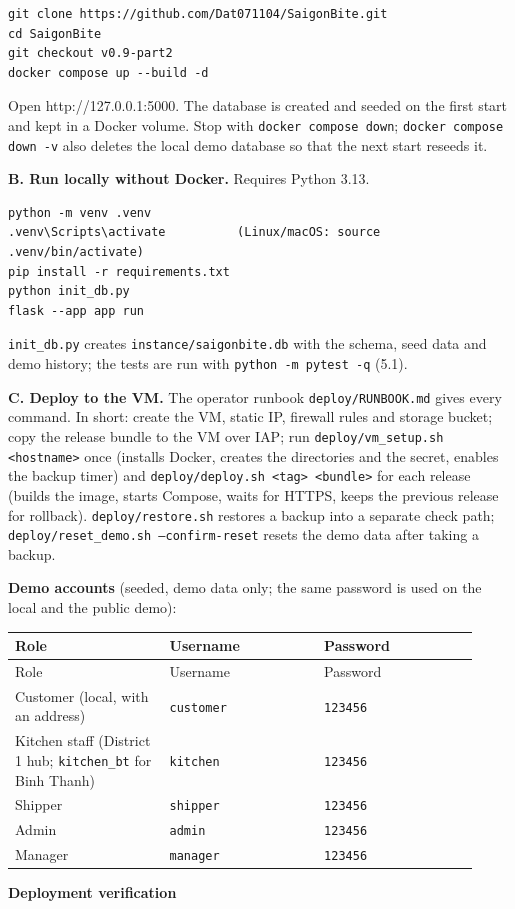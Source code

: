 \begin{lstlisting}
git clone https://github.com/Dat071104/SaigonBite.git
cd SaigonBite
git checkout v0.9-part2
docker compose up --build -d
\end{lstlisting}
Open http://127.0.0.1:5000. The database is created and seeded on the first start and kept in a Docker volume. Stop with \texttt{docker compose down}; \texttt{docker compose down -v} also deletes the local demo database so that the next start reseeds it.

\textbf{B. Run locally without Docker.} Requires Python 3.13.

\begin{lstlisting}
python -m venv .venv
.venv\Scripts\activate          (Linux/macOS: source .venv/bin/activate)
pip install -r requirements.txt
python init_db.py
flask --app app run
\end{lstlisting}
\texttt{init\_\allowbreak{}db.\allowbreak{}py} creates \texttt{instance/\allowbreak{}saigonbite.\allowbreak{}db} with the schema, seed data and demo history; the tests are run with \texttt{python -m pytest -q} (5.1).

\textbf{C. Deploy to the VM.} The operator runbook \texttt{deploy/\allowbreak{}RUNBOOK.\allowbreak{}md} gives every command. In short: create the VM, static IP, firewall rules and storage bucket; copy the release bundle to the VM over IAP; run \texttt{deploy/\allowbreak{}vm\_\allowbreak{}setup.\allowbreak{}sh \textless{}hostname\textgreater{}} once (installs Docker, creates the directories and the secret, enables the backup timer) and \texttt{deploy/\allowbreak{}deploy.\allowbreak{}sh \textless{}tag\textgreater{} \textless{}bundle\textgreater{}} for each release (builds the image, starts Compose, waits for HTTPS, keeps the previous release for rollback). \texttt{deploy/\allowbreak{}restore.\allowbreak{}sh} restores a backup into a separate check path; \texttt{deploy/\allowbreak{}reset\_\allowbreak{}demo.\allowbreak{}sh --confirm-reset} resets the demo data after taking a backup.

\textbf{Demo accounts} (seeded, demo data only; the same password is used on the local and the public demo):

\begin{longtable}{>{\raggedright\arraybackslash}p{0.3067\linewidth}>{\raggedright\arraybackslash}p{0.3067\linewidth}>{\raggedright\arraybackslash}p{0.3067\linewidth}}
Role & Username & Password \\
\hline\endfirsthead
Role & Username & Password \\
\hline\endhead
Customer (local, with an address) & \texttt{customer} & \texttt{123456} \\
Kitchen staff (District 1 hub; \texttt{kitchen\_\allowbreak{}bt} for Binh Thanh) & \texttt{kitchen} & \texttt{123456} \\
Shipper & \texttt{shipper} & \texttt{123456} \\
Admin & \texttt{admin} & \texttt{123456} \\
Manager & \texttt{manager} & \texttt{123456} \\
\end{longtable}
\textbf{Deployment verification}

